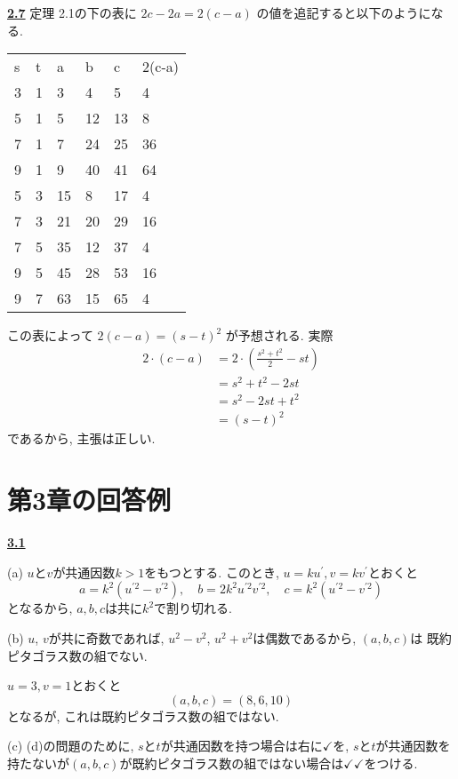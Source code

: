 \documentclass{jarticle}
\newcommand{\ccheckmark}{\checkmark \checkmark}
\newcommand{\cnt}[1]{\noindent \underline{\textbf{#1}}}
\begin{document}

\cnt{2.7} %
定理 2.1の下の表に $2c - 2a = 2(c-a)$ の値を追記すると以下のようになる.

\begin{tabular}{llllll}
s & t & a & b & c & 2(c-a) \\
3 & 1 & 3 & 4 & 5 & 4 \\
5 & 1 & 5 & 12 & 13 & 8 \\
7 & 1 & 7 & 24 & 25 & 36 \\
9 & 1 & 9 & 40 & 41 & 64 \\
5 & 3 & 15 & 8 & 17 & 4 \\
7 & 3 & 21 & 20 & 29 & 16 \\
7 & 5 & 35 & 12 & 37 & 4 \\
9 & 5 & 45 & 28 & 53 & 16 \\
9 & 7 & 63 & 15 & 65 & 4
\end{tabular}

この表によって $2(c-a) = (s-t)^2$ が予想される.
実際
\begin{align*}
2 \cdot (c-a)
  &= 2\cdot (\frac{s^2 + t^2}{2} - st) \\
  &= s^2 + t^2 - 2st \\
  &= s^2 - 2st + t^2 \\
  &= (s-t)^2
\end{align*}
であるから, 主張は正しい.

\section{第3章の回答例} %

\cnt{3.1} %

\noindent (a) %
$u$と$v$が共通因数$k > 1$をもつとする.
このとき, $u = ku^\prime, v = kv^\prime$とおくと
\[
  a = k^2(u^{\prime 2} - v^{\prime 2}), \quad
  b = 2k^2 u^{\prime 2} v^{\prime 2}, \quad
  c = k^2 (u^{\prime 2} - v^{\prime 2})
\]
となるから, $a, b, c$は共に$k^2$で割り切れる.

\noindent (b) %
$u$, $v$が共に奇数であれば, $u^2 - v^2$, $u^2 + v^2$は偶数であるから, $(a, b, c)$は
  既約ピタゴラス数の組でない.

$u=3, v=1$とおくと
\[
  (a, b, c) = (8, 6, 10)
\]
となるが, これは既約ピタゴラス数の組ではない.

\noindent (c) %
(d)の問題のために, $s$と$t$が共通因数を持つ場合は右に$\checkmark$を,
$s$と$t$が共通因数を持たないが$(a, b, c)$が既約ピタゴラス数の組ではない場合は$\ccheckmark$をつける.
\end{document}
